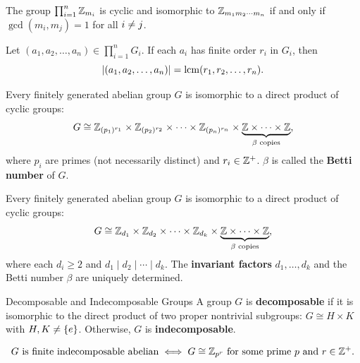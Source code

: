 \documentclass[12pt,a4paper]{article}
\begin{document}
    \begin{thm}\label{0.2.2}
        The group $\prod_{i=1}^n \mathbb{Z}_{m_i}$ is cyclic and isomorphic to $\mathbb{Z}_{m_1 m_2 \cdots m_n}$ if and only if $\gcd(m_i, m_j) = 1$ for all $i \neq j$.
    \end{thm}
    \bigskip

    \begin{thm}
        Let $(a_1, a_2, \ldots, a_n) \in \prod_{i=1}^n G_i$. If each $a_i$ has finite order $r_i$ in $G_i$, then
        \[
            \left\lvert (a_1, a_2, \ldots, a_n) \right\rvert = \operatorname{lcm}(r_1, r_2, \ldots, r_n).
        \]
    \end{thm}
    \bigskip

    \begin{thm}
        Every finitely generated abelian group $G$ is isomorphic to a direct product of cyclic groups:
        \[
            G \cong \mathbb{Z}_{(p_1)^{r_1}} \times \mathbb{Z}_{(p_2)^{r_2}} \times \cdots \times \mathbb{Z}_{(p_n)^{r_n}} \times \underbrace{\mathbb{Z} \times \cdots \times \mathbb{Z}}_{\beta \text{ copies}},
        \]
        where $p_i$ are primes (not necessarily distinct) and $r_i \in \mathbb{Z}^+$. $\beta$ is called the \textbf{Betti number} of $G$.
    \end{thm}
    \bigskip

    \begin{thm}
        Every finitely generated abelian group $G$ is isomorphic to a direct product of cyclic groups:
        \[
            G \cong \mathbb{Z}_{d_1} \times \mathbb{Z}_{d_2} \times \cdots \times \mathbb{Z}_{d_k} \times \underbrace{\mathbb{Z} \times \cdots \times \mathbb{Z}}_{\beta \text{ copies}},
        \]
        where each $d_i \ge 2$ and $d_1 \mid d_2 \mid \cdots \mid d_k$. The \textbf{invariant factors} $d_1, \ldots, d_k$ and the Betti number $\beta$ are uniquely determined.
    \end{thm}
    \bigskip

    \begin{defi}{Decomposable and Indecomposable Groups}
        A group $G$ is \textbf{decomposable} if it is isomorphic to the direct product of two proper nontrivial subgroups: $G \cong H \times K$ with $H, K \neq \left\{ e \right\}$. Otherwise, $G$ is \textbf{indecomposable}.
    \end{defi}
    \bigskip

    \begin{thm}
        \[
            G \text{ is finite indecomposable abelian} \iff G \cong \mathbb{Z}_{p^r} \text{ for some prime } p \text{ and } r \in \mathbb{Z}^+.
        \]
    \end{thm}
    \bigskip
\end{document}
